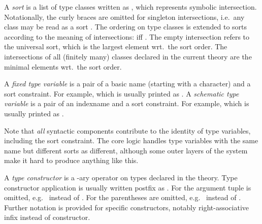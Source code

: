 \begin{isabellebody}
\begin{isamarkuptext}
  A \emph{sort} is a list of type classes written as , which represents symbolic
  intersection.  Notationally, the curly braces are omitted for
  singleton intersections, i.e.\ any class  may be read as
  a sort .  The ordering on type classes is extended to
  sorts according to the meaning of intersections:  iff
  .  The empty intersection
  \isa{{\isacharbraceleft}{\isacharbraceright}} refers to the universal sort, which is the largest
  element wrt.\ the sort order.  The intersections of all (finitely
  many) classes declared in the current theory are the minimal
  elements wrt.\ the sort order.

  \medskip A \emph{fixed type variable} is a pair of a basic name
  (starting with a \isa{{\isacharprime}} character) and a sort constraint.  For
  example,  which is usually printed as .  A \emph{schematic type variable} is a pair of an
  indexname and a sort constraint.  For example,  which is usually printed as .

  Note that \emph{all} syntactic components contribute to the identity
  of type variables, including the sort constraint.  The core logic
  handles type variables with the same name but different sorts as
  different, although some outer layers of the system make it hard to
  produce anything like this.

  A \emph{type constructor} \isa{{\isasymkappa}} is a -ary operator
  on types declared in the theory.  Type constructor application is
  usually written postfix as .  For 
  the argument tuple is omitted, e.g.\  instead of
  .  For  the parentheses are omitted,
  e.g.\  instead of .  Further
  notation is provided for specific constructors, notably
  right-associative infix \isa{{\isasymalpha}\ {\isasymRightarrow}\ {\isasymbeta}} instead of  constructor.
  

\end{isamarkuptext}
\end{isabellebody}
